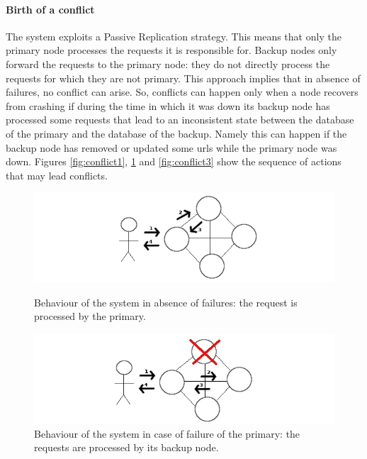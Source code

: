 \documentclass{article}
\begin{document}
\paragraph{Birth of a conflict} The system exploits a Passive Replication strategy. This means that only the primary node processes the requests it is responsible for. Backup nodes only forward the requests to the primary node: they do not directly process the requests for which they are not primary. This approach implies that in absence of failures, no conflict can arise. So, conflicts can happen only when a node recovers from crashing if during the time in which it was down its backup node has processed some requests that lead to an inconsistent state between the database of the primary and the database of the backup. Namely this can happen if the backup node has removed or updated some urls while the primary node was down. Figures \ref{fig:conflict1}, \ref{fig:conflict2} and \ref{fig:conflict3} show the sequence of actions that may lead conflicts. 

\begin{figure}
  \includegraphics[width=\linewidth]{conflict1}
  \caption{Behaviour of the system in absence of failures: the request is processed by the primary.}\label{fig:conflict1}
\endminipage\hfill
{}
  \includegraphics[width=\linewidth]{conflict2}
  \caption{Behaviour of the system in case of failure of the primary: the requests are processed by its backup node.}\label{fig:conflict2}
\endminipage\hfill
\end{figure}
\end{document}

